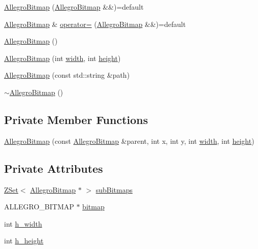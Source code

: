 \begin{DoxyCompactItemize}
\item 
\hyperlink{classZeta_1_1AllegroBitmap_a4c1224bf83513d60af3209d3807a9c70}{Allegro\+Bitmap} (\hyperlink{classZeta_1_1AllegroBitmap}{Allegro\+Bitmap} \&\&)=default
\item 
\hyperlink{classZeta_1_1AllegroBitmap}{Allegro\+Bitmap} \& \hyperlink{classZeta_1_1AllegroBitmap_a645f5970ef80feef64ad19d9c99773ca}{operator=} (\hyperlink{classZeta_1_1AllegroBitmap}{Allegro\+Bitmap} \&\&)=default
\item 
\hyperlink{classZeta_1_1AllegroBitmap_ab8a2848f4c9f089363a7ab0e261b4107}{Allegro\+Bitmap} ()
\item 
\hyperlink{classZeta_1_1AllegroBitmap_ad931383a1e65f676b78b5f85200f3e3d}{Allegro\+Bitmap} (int \hyperlink{classZeta_1_1Bitmap_affa526cccd51b4ac5db7aac25ff7f6a9}{width}, int \hyperlink{classZeta_1_1Bitmap_a4d9a82acc6c418dc9b72227b0d63d9aa}{height})
\item 
\hyperlink{classZeta_1_1AllegroBitmap_abc130d8cfc269eae73b18802f3022949}{Allegro\+Bitmap} (const std\+::string \&path)
\item 
\hyperlink{classZeta_1_1AllegroBitmap_ad4f55c47944ac52b4d4970e648e8be91}{$\sim$\+Allegro\+Bitmap} ()
\end{DoxyCompactItemize}
\subsection*{Private Member Functions}
\begin{DoxyCompactItemize}
\item 
\hyperlink{classZeta_1_1AllegroBitmap_ad7310439fb73c60db7979f21e438f89f}{Allegro\+Bitmap} (const \hyperlink{classZeta_1_1AllegroBitmap}{Allegro\+Bitmap} \&parent, int x, int y, int \hyperlink{classZeta_1_1Bitmap_affa526cccd51b4ac5db7aac25ff7f6a9}{width}, int \hyperlink{classZeta_1_1Bitmap_a4d9a82acc6c418dc9b72227b0d63d9aa}{height})
\end{DoxyCompactItemize}
\subsection*{Private Attributes}
\begin{DoxyCompactItemize}
\item 
\hyperlink{namespaceZeta_a92c229b4db6ab7275c2b7f32bdfabc87}{Z\+Set}$<$ \hyperlink{classZeta_1_1AllegroBitmap}{Allegro\+Bitmap} $\ast$ $>$ \hyperlink{classZeta_1_1AllegroBitmap_ac12c67de5ad5f7e08ec77bff1def3e15}{sub\+Bitmaps}
\item 
A\+L\+L\+E\+G\+R\+O\+\_\+\+B\+I\+T\+M\+A\+P $\ast$ \hyperlink{classZeta_1_1AllegroBitmap_aec65e1335da328dd4d7964e97297ea72}{bitmap}
\item 
int \hyperlink{classZeta_1_1AllegroBitmap_a223f2bc3bdc93e0d8195bd29bcaadbc7}{h\+\_\+width}
\item 
int \hyperlink{classZeta_1_1AllegroBitmap_aca7f1a2bb6f23d51235f04dfba1ebbfb}{h\+\_\+height}
\end{DoxyCompactItemize}
